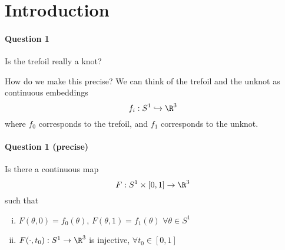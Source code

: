 \documentclass{article}
\numberwithin{nthm}{subsection}
\begin{document}
\maketitle
\section{Introduction}

\paragraph{Question 1} Is the trefoil really a knot?

How do we make this precise?
We can think of the trefoil and the unknot as continuous embeddings
\begin{equation*}
    f_i: S^1 \hookrightarrow \R^3
\end{equation*}
where $f_0$ corresponds to the trefoil, and $f_1$ corresponds to the unknot.

\paragraph{Question 1 (precise)} Is there a continuous map
\begin{equation*}
    F:S^1 \times [0, 1] \to \R^3
\end{equation*}
such that
\begin{enumerate}[(i)]
    \item $F(\theta, 0) = f_0(\theta)$, $F(\theta, 1) = f_1(\theta)$ $\forall \theta \in S^1$
    \item $F(\cdot, t_0): S^1 \to \R^3$ is injective, $\forall t_0 \in [0, 1]$
\end{enumerate}
\end{document}
